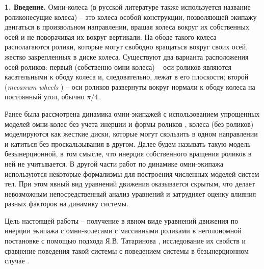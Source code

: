 {\bf 1. Введение.}
Омни-колеса (в русской литературе также используется название роликонесущие колеса) -- это колеса особой конструкции, позволяющей экипажу двигаться в произвольном направлении, вращая колеса вокруг их собственных осей и не поворачивая их вокруг вертикали. На ободе такого колеса располагаются ролики, которые могут свободно вращаться вокруг своих осей, жестко закрепленных в диске колеса. Существуют два варианта расположения осей роликов: первый  (собственно омни-колеса) -- оси роликов являются касательными к ободу колеса и, следовательно, лежат в его плоскости; второй (\textit{mecanum wheels} \cite{mecanum}) -- оси роликов развернуты вокруг нормали к ободу колеса на постоянный угол, обычно $\pi/4$.

Ранее была рассмотрена динамика омни-экипажей с использованием упрощенных моделей омни-колес без учета инерции и формы роликов \cite{ZobovaTatarinovPMM, formalskii, borisov, ZobovaTatarinovAspecty2006, zobova2008svobodnye8020851, Martynenko2010}, колеса (без роликов) моделируются как жесткие диски, которые могут скользить в одном направлении и катиться без проскальзывания в другом. Далее будем называть такую модель безынерционной, в том смысле, что инерция собственного вращения роликов в ней не учитывается. В другой части работ по динамике омни-экипажа \cite{KosenkoGerasimov, Tobolar, Williams2002, Ashmore2002} используются некоторые формализмы для построения численных моделей систем тел. При этом явный вид уравнений движения оказывается скрытым, что делает невозможным непосредственный  анализ уравнений и затрудняет оценку влияния разных факторов на динамику системы.


Цель настоящей работы -- получение в явном виде уравнений движения по инерции экипажа с омни-колесами с массивными роликами в неголономной постановке с помощью подхода Я.В. Татаринова \cite{Tatarinov}, исследование их свойств и сравнение поведения такой системы с поведением системы в безынерционном случае \cite{Zobova2011}.

